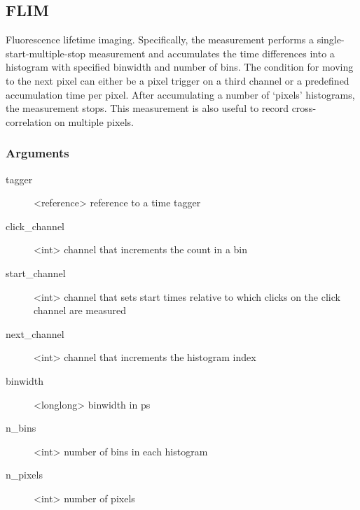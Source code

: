 \documentclass[letterpaper,10pt,english]{sphinxmanual}
\begin{document}
\subsection{FLIM}
\label{sections/api:flim}
Fluorescence lifetime imaging. Specifically, the measurement performs a single-start-multiple-stop measurement
and accumulates the time differences into a histogram with specified binwidth and number of bins. The condition
for moving to the next pixel can either be a pixel trigger on a third channel or a predefined accumulation
time per pixel. After accumulating a number of `pixels' histograms, the measurement stops. This measurement
is also useful to record cross-correlation on multiple pixels.


\subsubsection{Arguments}
\label{sections/api:id10}\begin{description}
\item[{tagger}] \leavevmode
\textless{}reference\textgreater{} reference to a time tagger

\item[{click\_channel}] \leavevmode
\textless{}int\textgreater{} channel that increments the count in a bin

\item[{start\_channel}] \leavevmode
\textless{}int\textgreater{} channel that sets start times relative to which clicks on the click channel are measured

\item[{next\_channel}] \leavevmode
\textless{}int\textgreater{} channel that increments the histogram index

\item[{binwidth}] \leavevmode
\textless{}longlong\textgreater{} binwidth in ps

\item[{n\_bins}] \leavevmode
\textless{}int\textgreater{} number of bins in each histogram

\item[{n\_pixels}] \leavevmode
\textless{}int\textgreater{} number of pixels

\end{description}
\end{document}
